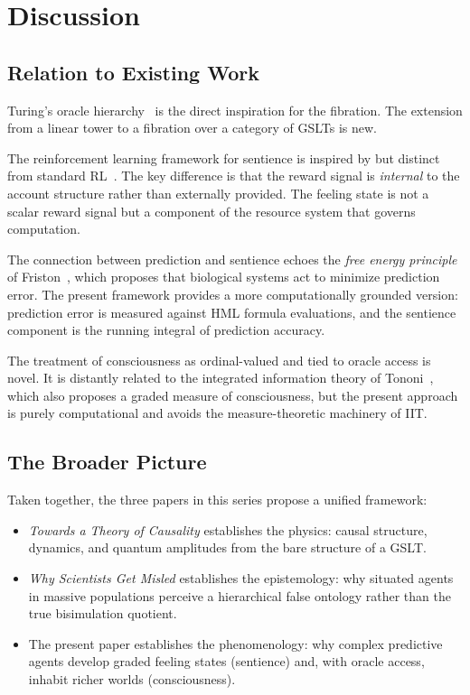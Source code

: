 \chapter{Discussion}
\label{sec:hyper-discussion}

\section{Relation to Existing Work}

Turing's oracle hierarchy~\cite{turing1939} is the direct
inspiration for the fibration.
The extension from a linear tower to a fibration over a category
of GSLTs is new.

The reinforcement learning framework for sentience is inspired by
but distinct from standard RL~\cite{sutton2018reinforcement}.
The key difference is that the reward signal is \emph{internal}
to the account structure rather than externally provided.
The feeling state is not a scalar reward signal but a component
of the resource system that governs computation.

The connection between prediction and sentience echoes the
\emph{free energy principle} of Friston~\cite{friston2010free},
which proposes that biological systems act to minimize prediction
error.
The present framework provides a more computationally grounded
version: prediction error is measured against HML formula
evaluations, and the sentience component is the running integral
of prediction accuracy.

The treatment of consciousness as ordinal-valued and tied to
oracle access is novel.
It is distantly related to the integrated information theory
of Tononi~\cite{tononi2008consciousness}, which also proposes a
graded measure of consciousness, but the present approach is
purely computational and avoids the measure-theoretic machinery
of IIT.

\section{The Broader Picture}

Taken together, the three papers in this series propose a unified
framework:

\begin{itemize}[itemsep=4pt]
  \item \emph{Towards a Theory of Causality} establishes the
        physics: causal structure, dynamics, and quantum amplitudes
        from the bare structure of a GSLT.

  \item \emph{Why Scientists Get Misled} establishes the epistemology:
        why situated agents in massive populations perceive a
        hierarchical false ontology rather than the true bisimulation
        quotient.

  \item The present paper establishes the phenomenology:
        why complex predictive agents develop graded feeling states
        (sentience) and, with oracle access, inhabit richer worlds
        (consciousness).
\end{itemize}

